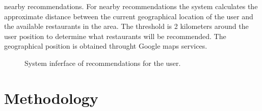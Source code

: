 nearby recommendations. For nearby recommendations the system
calculates the approximate distance between the current geographical
location of the user and the available restaurants in the area.  The
threshold is 2 kilometers around the user position to determine what
restaurants will be recommended. The geographical position is
obtained throught Google maps services.
\begin{figure}
\captionsetup{font=footnotesize}
\centering
{}
\caption{System inferface of recommendations for the user.}
\label{fig:recom}    
\end{figure}

\section{Methodology} 

